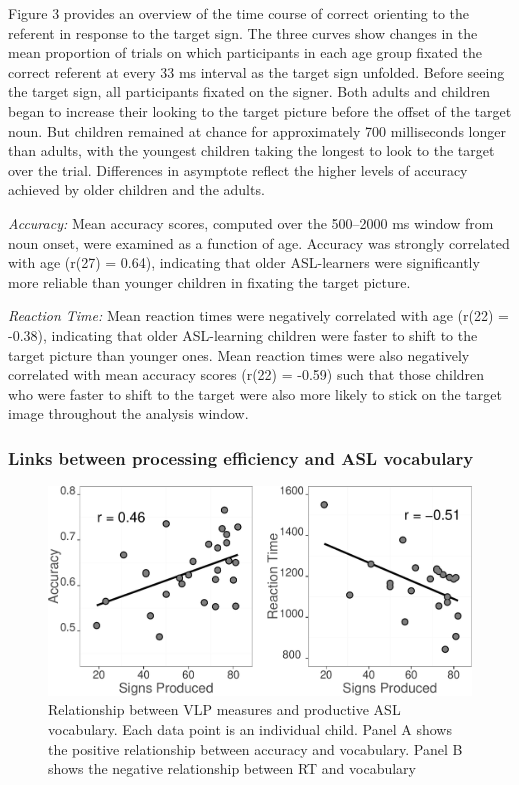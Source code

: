 \documentclass[12pt,]{article}
\begin{document}
Figure 3 provides an overview of the time course of correct orienting to
the referent in response to the target sign. The three curves show
changes in the mean proportion of trials on which participants in each
age group fixated the correct referent at every 33 ms interval as the
target sign unfolded. Before seeing the target sign, all participants
fixated on the signer. Both adults and children began to increase their
looking to the target picture before the offset of the target noun. But
children remained at chance for approximately 700 milliseconds longer
than adults, with the youngest children taking the longest to look to
the target over the trial. Differences in asymptote reflect the higher
levels of accuracy achieved by older children and the adults.

\emph{Accuracy:} Mean accuracy scores, computed over the 500--2000 ms
window from noun onset, were examined as a function of age. Accuracy was
strongly correlated with age (r(27) = 0.64), indicating that older
ASL-learners were significantly more reliable than younger children in
fixating the target picture.

\emph{Reaction Time:} Mean reaction times were negatively correlated
with age (r(22) = -0.38), indicating that older ASL-learning children
were faster to shift to the target picture than younger ones. Mean
reaction times were also negatively correlated with mean accuracy scores
(r(22) = -0.59) such that those children who were faster to shift to the
target were also more likely to stick on the target image throughout the
analysis window.

\subsubsection{Links between processing efficiency and ASL
vocabulary}\label{links-between-processing-efficiency-and-asl-vocabulary}

\begin{figure}[htbp]
\centering
\includegraphics{Figs/vocab scatter plots-1.pdf}
\caption{Relationship between VLP measures and productive ASL
vocabulary. Each data point is an individual child. Panel A shows the
positive relationship between accuracy and vocabulary. Panel B shows the
negative relationship between RT and vocabulary}
\end{figure}
\end{document}
